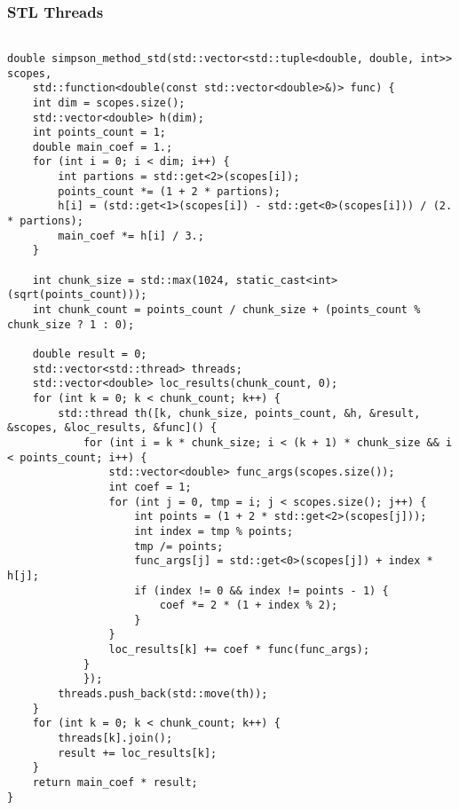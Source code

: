 \documentclass[14pt, a4paper]{extarticle}
\begin{document}
    \subsubsection{STL Threads}
  \begin{lstlisting}

double simpson_method_std(std::vector<std::tuple<double, double, int>> scopes,
    std::function<double(const std::vector<double>&)> func) {
    int dim = scopes.size();
    std::vector<double> h(dim);
    int points_count = 1;
    double main_coef = 1.;
    for (int i = 0; i < dim; i++) {
        int partions = std::get<2>(scopes[i]);
        points_count *= (1 + 2 * partions);
        h[i] = (std::get<1>(scopes[i]) - std::get<0>(scopes[i])) / (2. * partions);
        main_coef *= h[i] / 3.;
    }

    int chunk_size = std::max(1024, static_cast<int>(sqrt(points_count)));
    int chunk_count = points_count / chunk_size + (points_count % chunk_size ? 1 : 0);

    double result = 0;
    std::vector<std::thread> threads;
    std::vector<double> loc_results(chunk_count, 0);
    for (int k = 0; k < chunk_count; k++) {
        std::thread th([k, chunk_size, points_count, &h, &result, &scopes, &loc_results, &func]() {
            for (int i = k * chunk_size; i < (k + 1) * chunk_size && i < points_count; i++) {
                std::vector<double> func_args(scopes.size());
                int coef = 1;
                for (int j = 0, tmp = i; j < scopes.size(); j++) {
                    int points = (1 + 2 * std::get<2>(scopes[j]));
                    int index = tmp % points;
                    tmp /= points;
                    func_args[j] = std::get<0>(scopes[j]) + index * h[j];
                    if (index != 0 && index != points - 1) {
                        coef *= 2 * (1 + index % 2);
                    }
                }
                loc_results[k] += coef * func(func_args);
            }
            });
        threads.push_back(std::move(th));
    }
    for (int k = 0; k < chunk_count; k++) {
        threads[k].join();
        result += loc_results[k];
    }
    return main_coef * result;
}
\end{lstlisting}
\end{document}
